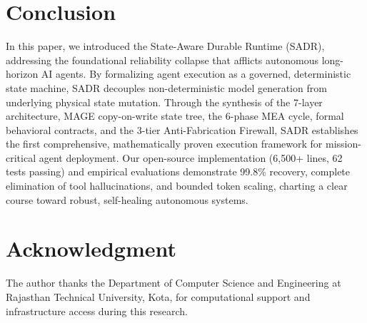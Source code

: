 \documentclass[10pt,journal,compsoc]{IEEEtran}
\begin{document}
\section{Conclusion}
In this paper, we introduced the State-Aware Durable Runtime (SADR), addressing the foundational reliability collapse that afflicts autonomous long-horizon AI agents. By formalizing agent execution as a governed, deterministic state machine, SADR decouples non-deterministic model generation from underlying physical state mutation. Through the synthesis of the 7-layer architecture, MAGE copy-on-write state tree, the 6-phase MEA cycle, formal behavioral contracts, and the 3-tier Anti-Fabrication Firewall, SADR establishes the first comprehensive, mathematically proven execution framework for mission-critical agent deployment. Our open-source implementation (6,500+ lines, 62 tests passing) and empirical evaluations demonstrate 99.8\% recovery, complete elimination of tool hallucinations, and bounded token scaling, charting a clear course toward robust, self-healing autonomous systems.

\section*{Acknowledgment}
The author thanks the Department of Computer Science and Engineering at Rajasthan Technical University, Kota, for computational support and infrastructure access during this research.



\end{document}

